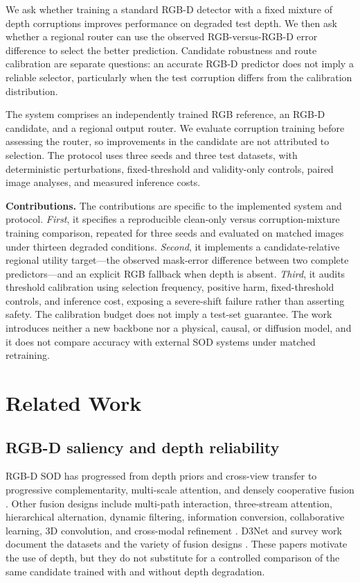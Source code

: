 \documentclass[11pt]{article}
\begin{document}
We ask whether training a standard RGB-D detector with a fixed mixture of depth corruptions improves performance on degraded test depth. We then ask whether a regional router can use the observed RGB-versus-RGB-D error difference to select the better prediction. Candidate robustness and route calibration are separate questions: an accurate RGB-D predictor does not imply a reliable selector, particularly when the test corruption differs from the calibration distribution.

The system comprises an independently trained RGB reference, an RGB-D candidate, and a regional output router. We evaluate corruption training before assessing the router, so improvements in the candidate are not attributed to selection. The protocol uses three seeds and three test datasets, with deterministic perturbations, fixed-threshold and validity-only controls, paired image analyses, and measured inference costs.

\noindent\textbf{Contributions.} The contributions are specific to the implemented system and protocol. \emph{First}, it specifies a reproducible clean-only versus corruption-mixture training comparison, repeated for three seeds and evaluated on matched images under thirteen degraded conditions. \emph{Second}, it implements a candidate-relative regional utility target---the observed mask-error difference between two complete predictors---and an explicit RGB fallback when depth is absent. \emph{Third}, it audits threshold calibration using selection frequency, positive harm, fixed-threshold controls, and inference cost, exposing a severe-shift failure rather than asserting safety. The calibration budget does not imply a test-set guarantee. The work introduces neither a new backbone nor a physical, causal, or diffusion model, and it does not compare accuracy with external SOD systems under matched retraining.

\section{Related Work}
\subsection{RGB-D saliency and depth reliability}
RGB-D SOD has progressed from depth priors and cross-view transfer to progressive complementarity, multi-scale attention, and densely cooperative fusion \cite{globalprior,lbe,crossview,pcf,dmra,jldcf,bbsnet}. Other fusion designs include multi-path interaction, three-stream attention, hierarchical alternation, dynamic filtering, information conversion, collaborative learning, 3D convolution, and cross-modal refinement \cite{mmci,tanse,hainet,hdfnet,icnet,conet,rd3d,cirnet}. D3Net and survey work document the datasets and the variety of fusion designs \cite{d3net,survey2021}. These papers motivate the use of depth, but they do not substitute for a controlled comparison of the same candidate trained with and without depth degradation.
\end{document}
